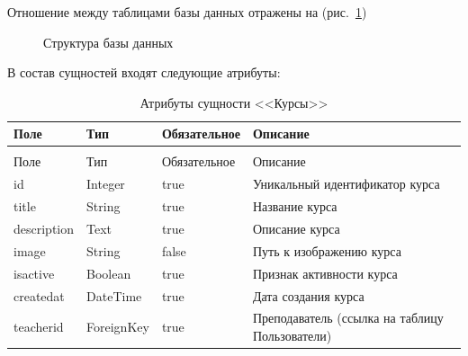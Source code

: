 Отношение между таблицами базы данных отражены на (рис.~\ref{bd:image})

\begin{figure}[ht]
	\caption{Структура базы данных}
	\label{bd:image}
\end{figure}

В состав сущностей входят следующие атрибуты:

\begin{xltabular}{\textwidth}{|l|l|p{3.2cm}|X|}
	\caption{Атрибуты сущности <<Курсы>>\label{courses:table}}\\ \hline
	Поле & Тип & Обязательное & Описание \\ \hline
	\endfirsthead
	\\ \hline
	Поле & Тип & Обязательное & Описание \\ \hline
	\endhead
	id & Integer & true & Уникальный идентификатор курса \\ \hline
	title & String & true & Название курса \\ \hline
	description & Text & true & Описание курса \\ \hline
	image & String & false & Путь к изображению курса \\ \hline
	isactive & Boolean & true & Признак активности курса \\ \hline
	createdat & DateTime & true & Дата создания курса \\ \hline
	teacherid & ForeignKey & true & Преподаватель (ссылка на таблицу Пользователи) \\ \hline
\end{xltabular}

